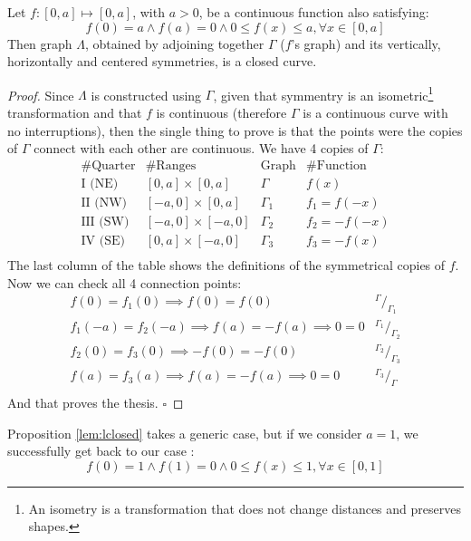 \begin{proposition}
\label{lem:lclosed}
Let $f:[0,a] \mapsto [0,a]$, with $a > 0$, be a continuous function also satisfying:
\begin{equation}
f(0)=a \wedge f(a)=0 \wedge 0 \leq f(x) \leq a, \forall x \in [0,a]
\end{equation}
Then graph $\Lambda$, obtained by adjoining together $\Gamma$ ($f$'s graph) and
its vertically, horizontally and centered symmetries, is a closed curve.
\begin{proof}
Since $\Lambda$ is constructed using $\Gamma$, given that symmentry is an 
isometric\footnote{An isometry is a transformation that does not change distances and
preserves shapes.} 
transformation and that $f$ is continuous (therefore $\Gamma$ is a continuous curve
with no interruptions), then the single thing to prove is that the points were
the copies of $\Gamma$ connect with each other are continuous. We have 4
copies of $\Gamma$:
\begin{equation*}
\begin{array}{c|c|c|c}
\text{\# Quarter} & \text{\# Ranges} & \text{Graph} & \text{\# Function} \\
\hline
\text{I (NE)} & [0,a] \times [0,a] & \Gamma & f(x) \\
\text{II (NW)} & [-a,0] \times [0,a] & \Gamma_1 & f_1 = f(-x) \\
\text{III (SW)} & [-a,0] \times [-a,0] & \Gamma_2 & f_2 = -f(-x) \\
\text{IV (SE)} & [0,a] \times [-a,0] & \Gamma_3 & f_3 = -f(x) \\
\end{array}
\end{equation*}
The last column of the table shows the definitions of the symmetrical copies of $f$.
Now we can check all 4 connection points:
\begin{equation}\label{eq:symms}
\begin{array}{l|c}
f(0) = f_1(0) \implies f(0) = f(0) & ^{\Gamma}/_{\Gamma_1} \\
f_1(-a) = f_2(-a) \implies f(a) = -f(a) \implies 0 = 0 & ^{\Gamma_1}/_{\Gamma_2} \\
f_2(0) = f_3(0) \implies -f(0) = -f(0) & ^{\Gamma_2}/_{\Gamma_3} \\
f(a) = f_3(a) \implies f(a) = -f(a) \implies 0 = 0 & ^{\Gamma_3}/_{\Gamma} \\
\end{array}
\end{equation}
And that proves the thesis.
$\square$
\end{proof}
\end{proposition}
Proposition \ref{lem:lclosed} takes a generic case, but if we consider $a=1$, we
successfully get back to our case \cite{exam1}:
\begin{equation}
\label{eq:fconds}
f(0)=1 \wedge f(1)=0 \wedge 0 \leq f(x) \leq 1, \forall x \in [0,1]
\end{equation}

